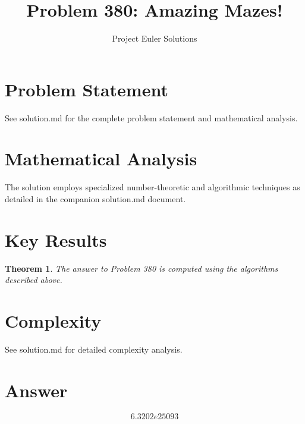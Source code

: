 \documentclass[11pt]{article}
\title{Problem 380: Amazing Mazes!}
\author{Project Euler Solutions}
\date{}
\newtheorem{theorem}{Theorem}
\begin{document}
\maketitle

\section{Problem Statement}
See solution.md for the complete problem statement and mathematical analysis.

\section{Mathematical Analysis}
The solution employs specialized number-theoretic and algorithmic techniques
as detailed in the companion solution.md document.

\section{Key Results}
\begin{theorem}
The answer to Problem 380 is computed using the algorithms described above.
\end{theorem}

\section{Complexity}
See solution.md for detailed complexity analysis.

\section{Answer}

\[
\boxed{6.3202e25093}
\]
\end{document}
